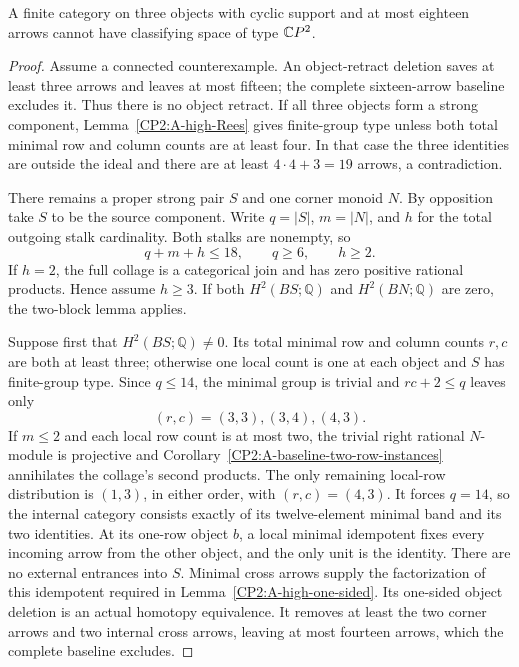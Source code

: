 \begin{theorem}
\label{CP2:A-strong-three-eighteen}
A finite category on three objects with cyclic support and at most
eighteen arrows cannot have classifying space of type $\mathbb{C}P^2$.
\end{theorem}
\begin{proof}
Assume a connected counterexample. An object-retract deletion
saves at least three arrows and leaves at most fifteen; the
complete sixteen-arrow baseline excludes it. Thus there is no
object retract. If all three objects form a strong component,
Lemma~\ref{CP2:A-high-Rees} gives finite-group type unless both
total minimal row and column counts are at least four. In that
case the three identities are outside the ideal and there are
at least $4\cdot4+3=19$ arrows, a contradiction.

There remains a proper strong pair $S$ and one corner monoid $N$.
By opposition take $S$ to be the source component. Write
$q=|S|$, $m=|N|$, and $h$ for the total outgoing stalk cardinality.
Both stalks are nonempty, so
\[
 q+m+h\le18,\qquad q\ge6,\qquad h\ge2.
\]
If $h=2$, the full collage is a categorical join and has zero
positive rational products. Hence assume $h\ge3$. If both
$H^2(BS;\mathbb Q)$ and $H^2(BN;\mathbb Q)$ are zero, the
two-block lemma applies.

Suppose first that $H^2(BS;\mathbb Q)\ne0$. Its total minimal
row and column counts $r,c$ are both at least three; otherwise
one local count is one at each object and $S$ has finite-group
type. Since $q\le14$, the minimal group is trivial and
$rc+2\le q$ leaves only
\[
 (r,c)=(3,3),(3,4),(4,3).
\]
If $m\le2$ and each local row count is at most two, the trivial
right rational $N$-module is projective and
Corollary~\ref{CP2:A-baseline-two-row-instances} annihilates the
collage's second products. The only remaining local-row
distribution is $(1,3)$, in either order, with $(r,c)=(4,3)$.
It forces $q=14$, so the internal category consists exactly of
its twelve-element minimal band and its two identities.
At its one-row object $b$, a local minimal idempotent fixes every
incoming arrow from the other object, and the only unit is the
identity. There are no external entrances into $S$. Minimal cross
arrows supply the factorization of this idempotent required in
Lemma~\ref{CP2:A-high-one-sided}. Its one-sided object deletion
is an actual homotopy equivalence. It removes at least the two
corner arrows and two internal cross arrows, leaving at most
fourteen arrows, which the complete baseline excludes.


\end{proof}
